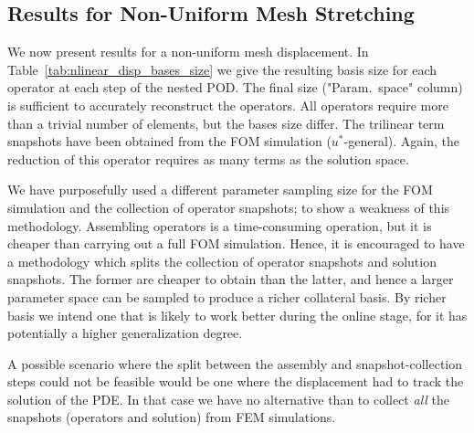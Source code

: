 \documentclass[../../thesis.tex]{subfiles}
\begin{document}
\clearpage
\subsection{Results for Non-Uniform Mesh Stretching}
\label{sec:arbitrary_mesh_results}
We now present results for a non-uniform mesh displacement. 
In Table~\ref{tab:nlinear_disp_bases_size} we give the resulting basis size 
for each operator at each step of the nested POD.
The final size (\mbox{"Param. space"} column) is sufficient to accurately reconstruct the operators.
All operators require more than a trivial number of elements, 
but the bases size differ.
The trilinear term snapshots have been obtained from the FOM simulation 
($u^{*}$-general).
Again, the reduction of this operator requires as many terms as the solution space.

We have purposefully used a different parameter sampling size 
for the FOM simulation and the collection of operator snapshots;
to show a weakness of this methodology.
Assembling operators is a time-consuming operation, 
but it is cheaper than carrying out a full FOM simulation.
Hence, it is encouraged to have a methodology which splits the collection
of operator snapshots and solution snapshots.
The former are cheaper to obtain than the latter, 
and hence a larger parameter space can be sampled to produce a richer collateral basis.
By richer basis we intend one that is likely to work better during the online stage, 
for it has potentially a higher generalization degree.

A possible scenario where the split between the assembly and snapshot-collection steps
could not be feasible would be one where the displacement had to track the solution of the PDE.
In that case we have no alternative than to collect 
\textit{all} the snapshots (operators and solution) from FEM simulations.
\end{document}
